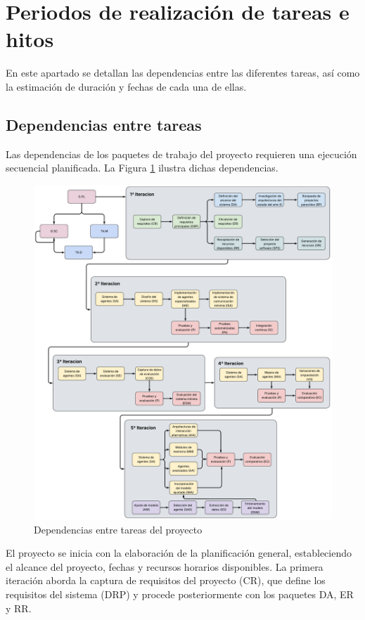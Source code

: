 \section{Periodos de realización de tareas e hitos}
En este apartado se detallan las dependencias entre las diferentes tareas, así como la estimación de duración y fechas de cada una de ellas.

\subsection{Dependencias entre tareas}
Las dependencias de los paquetes de trabajo del proyecto requieren una ejecución secuencial planificada. La Figura \ref{fig:dependencias} ilustra dichas dependencias.


\begin{figure}[hbtp]
  \centering
  \hspace{-3cm}\includegraphics[scale=0.4325]{figures/dep_mod.pdf}%
  \caption{Dependencias entre tareas del proyecto}
  \label{fig:dependencias}
\end{figure}

El proyecto se inicia con la elaboración de la planificación general, estableciendo el alcance del proyecto, fechas y recursos horarios disponibles. La primera iteración aborda la captura de requisitos del proyecto (CR), que define los requisitos del sistema (DRP) y procede posteriormente con los paquetes DA, ER y RR.

